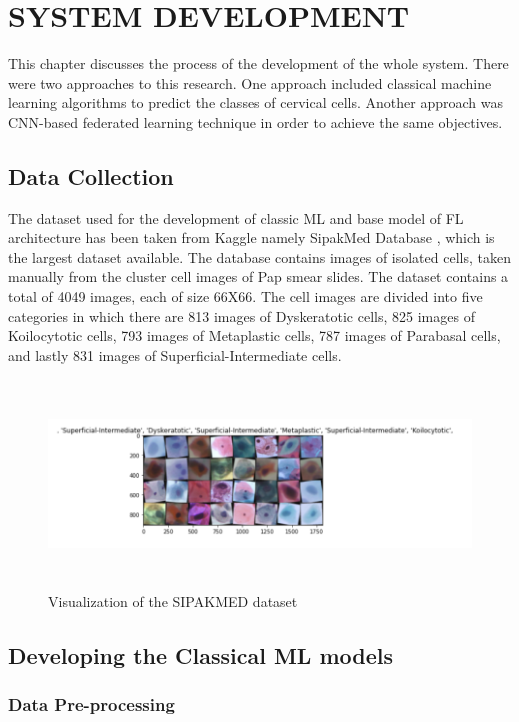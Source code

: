\chapter{SYSTEM DEVELOPMENT}\label{SYSTEM DEVELOPMENT}
This chapter discusses the process of the development of the whole system. There were two approaches to this research. One approach included classical machine learning algorithms to predict the classes of cervical cells. Another approach was CNN-based federated learning technique in order to achieve the same objectives.
\section{Data Collection}

The dataset used for the development of classic ML and base model of FL architecture has been taken from Kaggle namely SipakMed Database \cite{ar29}, which is the largest dataset available. The database contains images of isolated cells, taken manually from the cluster cell images of Pap smear slides. The dataset contains a total of 4049 images, each of size 66X66. The cell images are divided into five categories in which there are 813 images of Dyskeratotic cells, 825 images of Koilocytotic cells, 793 images of Metaplastic cells, 787 images of Parabasal cells, and lastly 831 images of Superficial-Intermediate cells.

\begin{figure}[H]
\centering
\includegraphics[width=170mm,height=55mm]{figures/data_visualization.png}
\caption{Visualization of the SIPAKMED dataset}
\label{Visualization of the SIPAKMED dataset}
\end{figure}

\section{Developing the Classical ML models}
\subsection{Data Pre-processing} \

